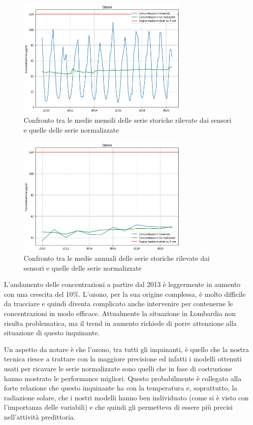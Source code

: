 \documentclass[a4paper,12pt]{report}
\begin{document}
\begin{figure}[h]
\centering
\includegraphics[width=0.75\textwidth]{o3_medie_mensili}
\caption{Confronto tra le medie mensili delle serie storiche rilevate dai sensori e quelle delle serie normalizzate}
\label{fig:o3_medie_mensili}
\end{figure}

\begin{figure}[h]
\centering
\includegraphics[width=0.75\textwidth]{o3_medie_annuali}
\caption{Confronto tra le medie annuali delle serie storiche rilevate dai sensori e quelle delle serie normalizzate}
\label{fig:o3_medie_annuali}
\end{figure}

L'andamento delle concentrazioni a partire dal 2013 è leggermente in aumento con una crescita del 10\%. L'ozono, per la sua origine complessa, è molto difficile da tracciare e quindi diventa complicato anche intervenire per contenerne le concentrazioni in modo efficace. Attualmente la situazione in Lombardia non risulta problematica, ma il trend in aumento richiede di porre attenzione alla situazione di questo inquinante.

Un aspetto da notare è che l'ozono, tra tutti gli inquinanti, è quello che la nostra tecnica riesce a trattare con la maggiore precisione ed infatti i modelli ottenuti usati per ricavare le serie normalizzate sono quelli che in fase di costruzione hanno mostrato le performance migliori. Questo probabilmente è collegato alla forte relazione che questo inquinante ha con la temperatura e, soprattutto, la radiazione solare, che i nostri modelli hanno ben individuato (come si è visto con l'importanza delle variabili) e che quindi gli permetteva di essere più precisi nell'attività predittoria.
\end{document}
